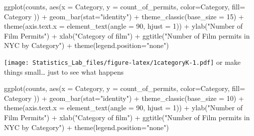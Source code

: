 \documentclass[
]{book}
\newenvironment{Shaded}{\begin{snugshade}}{\end{snugshade}}
\newcommand{\AttributeTok}[1]{\textcolor[rgb]{0.77,0.63,0.00}{#1}}
\newcommand{\DecValTok}[1]{\textcolor[rgb]{0.00,0.00,0.81}{#1}}
\newcommand{\FunctionTok}[1]{\textcolor[rgb]{0.00,0.00,0.00}{#1}}
\newcommand{\NormalTok}[1]{#1}
\newcommand{\SpecialCharTok}[1]{\textcolor[rgb]{0.00,0.00,0.00}{#1}}
\newcommand{\StringTok}[1]{\textcolor[rgb]{0.31,0.60,0.02}{#1}}
\begin{document}
\begin{Shaded}
\begin{Highlighting}[]
\FunctionTok{ggplot}\NormalTok{(counts, }\FunctionTok{aes}\NormalTok{(}\AttributeTok{x =}\NormalTok{ Category, }\AttributeTok{y =}\NormalTok{ count\_of\_permits, }
                   \AttributeTok{color=}\NormalTok{Category, }
                   \AttributeTok{fill=}\NormalTok{ Category )) }\SpecialCharTok{+}
  \FunctionTok{geom\_bar}\NormalTok{(}\AttributeTok{stat=}\StringTok{"identity"}\NormalTok{) }\SpecialCharTok{+} 
  \FunctionTok{theme\_classic}\NormalTok{(}\AttributeTok{base\_size =} \DecValTok{15}\NormalTok{) }\SpecialCharTok{+}
  \FunctionTok{theme}\NormalTok{(}\AttributeTok{axis.text.x =} \FunctionTok{element\_text}\NormalTok{(}\AttributeTok{angle =} \DecValTok{90}\NormalTok{, }\AttributeTok{hjust =} \DecValTok{1}\NormalTok{)) }\SpecialCharTok{+}
  \FunctionTok{ylab}\NormalTok{(}\StringTok{"Number of Film Permits"}\NormalTok{) }\SpecialCharTok{+} 
  \FunctionTok{xlab}\NormalTok{(}\StringTok{"Category of film"}\NormalTok{) }\SpecialCharTok{+}
  \FunctionTok{ggtitle}\NormalTok{(}\StringTok{"Number of Film permits in NYC by Category"}\NormalTok{) }\SpecialCharTok{+}
  \FunctionTok{theme}\NormalTok{(}\AttributeTok{legend.position=}\StringTok{"none"}\NormalTok{) }
\end{Highlighting}
\end{Shaded}

\texttt{[image: Statistics\_Lab\_files/figure-latex/1categoryK-1.pdf]}
or make things small\ldots{} just to see what happens

\begin{Shaded}
\begin{Highlighting}[]
\FunctionTok{ggplot}\NormalTok{(counts, }\FunctionTok{aes}\NormalTok{(}\AttributeTok{x =}\NormalTok{ Category, }\AttributeTok{y =}\NormalTok{ count\_of\_permits, }
                   \AttributeTok{color=}\NormalTok{Category, }
                   \AttributeTok{fill=}\NormalTok{ Category )) }\SpecialCharTok{+}
  \FunctionTok{geom\_bar}\NormalTok{(}\AttributeTok{stat=}\StringTok{"identity"}\NormalTok{) }\SpecialCharTok{+} 
  \FunctionTok{theme\_classic}\NormalTok{(}\AttributeTok{base\_size =} \DecValTok{10}\NormalTok{) }\SpecialCharTok{+}
  \FunctionTok{theme}\NormalTok{(}\AttributeTok{axis.text.x =} \FunctionTok{element\_text}\NormalTok{(}\AttributeTok{angle =} \DecValTok{90}\NormalTok{, }\AttributeTok{hjust =} \DecValTok{1}\NormalTok{)) }\SpecialCharTok{+}
  \FunctionTok{ylab}\NormalTok{(}\StringTok{"Number of Film Permits"}\NormalTok{) }\SpecialCharTok{+} 
  \FunctionTok{xlab}\NormalTok{(}\StringTok{"Category of film"}\NormalTok{) }\SpecialCharTok{+}
  \FunctionTok{ggtitle}\NormalTok{(}\StringTok{"Number of Film permits in NYC by Category"}\NormalTok{) }\SpecialCharTok{+}
  \FunctionTok{theme}\NormalTok{(}\AttributeTok{legend.position=}\StringTok{"none"}\NormalTok{) }
\end{Highlighting}
\end{Shaded}
\end{document}
